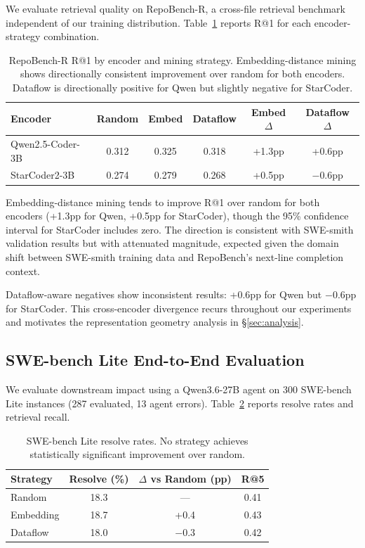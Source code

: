 \documentclass[11pt,a4paper]{article}
\begin{document}
We evaluate retrieval quality on RepoBench-R, a cross-file retrieval benchmark independent of our training distribution. Table~\ref{tab:repobench} reports R@1 for each encoder-strategy combination.

\begin{table}[t]
\centering
\small
\begin{tabular}{lccccc}
\toprule
\textbf{Encoder} & \textbf{Random} & \textbf{Embed} & \textbf{Dataflow} & \textbf{Embed $\Delta$} & \textbf{Dataflow $\Delta$} \\
\midrule
Qwen2.5-Coder-3B & 0.312 & 0.325 & 0.318 & +1.3pp & +0.6pp \\
StarCoder2-3B & 0.274 & 0.279 & 0.268 & +0.5pp & $-$0.6pp \\
\bottomrule
\end{tabular}
\caption{RepoBench-R R@1 by encoder and mining strategy. Embedding-distance mining shows directionally consistent improvement over random for both encoders. Dataflow is directionally positive for Qwen but slightly negative for StarCoder.}
\label{tab:repobench}
\end{table}

Embedding-distance mining tends to improve R@1 over random for both encoders (+1.3pp for Qwen, +0.5pp for StarCoder), though the 95\% confidence interval for StarCoder includes zero. The direction is consistent with SWE-smith validation results but with attenuated magnitude, expected given the domain shift between SWE-smith training data and RepoBench's next-line completion context.

Dataflow-aware negatives show inconsistent results: +0.6pp for Qwen but $-$0.6pp for StarCoder. This cross-encoder divergence recurs throughout our experiments and motivates the representation geometry analysis in \S\ref{sec:analysis}.

\subsection{SWE-bench Lite End-to-End Evaluation}
\label{sec:swebench}

We evaluate downstream impact using a Qwen3.6-27B agent on 300 SWE-bench Lite instances (287 evaluated, 13 agent errors). Table~\ref{tab:swebench} reports resolve rates and retrieval recall.

\begin{table}[t]
\centering
\small
\begin{tabular}{lccc}
\toprule
\textbf{Strategy} & \textbf{Resolve (\%)} & \textbf{$\Delta$ vs Random (pp)} & \textbf{R@5} \\
\midrule
Random & 18.3 & --- & 0.41 \\
Embedding & 18.7 & +0.4 & 0.43 \\
Dataflow & 18.0 & $-$0.3 & 0.42 \\
\bottomrule
\end{tabular}
\caption{SWE-bench Lite resolve rates. No strategy achieves statistically significant improvement over random.}
\label{tab:swebench}
\end{table}
\end{document}
